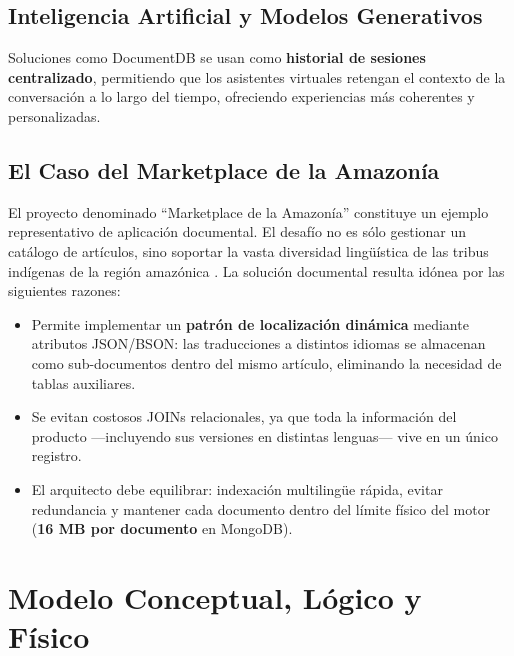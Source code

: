 \documentclass[conference]{IEEEtran}
\begin{document}
\subsection{Inteligencia Artificial y Modelos Generativos}
Soluciones como DocumentDB se usan como \textbf{historial de sesiones centralizado}, permitiendo que los asistentes virtuales retengan el contexto de la conversación a lo largo del tiempo, ofreciendo experiencias más coherentes y personalizadas.

\subsection{El Caso del Marketplace de la Amazonía}
El proyecto denominado ``Marketplace de la Amazonía'' constituye un ejemplo representativo de aplicación documental. El desafío no es sólo gestionar un catálogo de artículos, sino soportar la vasta diversidad lingüística de las tribus indígenas de la región amazónica \cite{marquez2026}. La solución documental resulta idónea por las siguientes razones:
\begin{itemize}
    \item Permite implementar un \textbf{patrón de localización dinámica} mediante atributos JSON/BSON: las traducciones a distintos idiomas se almacenan como sub-documentos dentro del mismo artículo, eliminando la necesidad de tablas auxiliares.
    \item Se evitan costosos JOINs relacionales, ya que toda la información del producto —incluyendo sus versiones en distintas lenguas— vive en un único registro.
    \item El arquitecto debe equilibrar: indexación multilingüe rápida, evitar redundancia y mantener cada documento dentro del límite físico del motor (\textbf{16 MB por documento} en MongoDB).
\end{itemize}

\section{Modelo Conceptual, Lógico y Físico}
\end{document}
